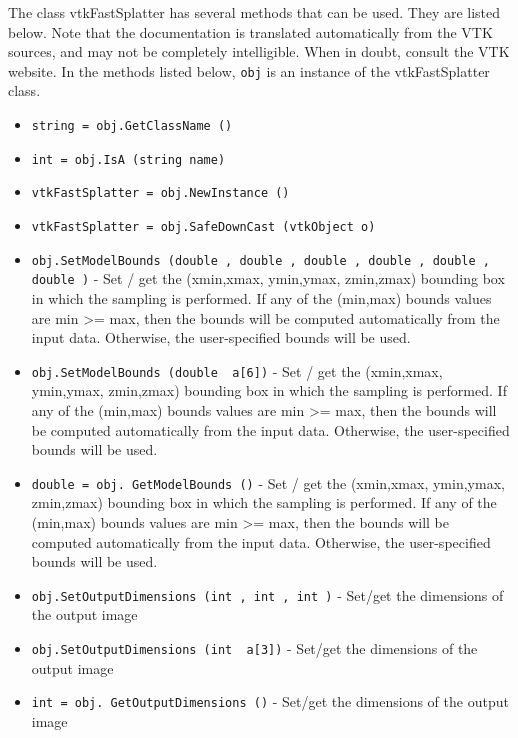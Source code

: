 The class vtkFastSplatter has several methods that can be used.
  They are listed below.
Note that the documentation is translated automatically from the VTK sources,
and may not be completely intelligible.  When in doubt, consult the VTK website.
In the methods listed below, \verb|obj| is an instance of the vtkFastSplatter class.
\begin{itemize}
\item  \verb|string = obj.GetClassName ()|

\item  \verb|int = obj.IsA (string name)|

\item  \verb|vtkFastSplatter = obj.NewInstance ()|

\item  \verb|vtkFastSplatter = obj.SafeDownCast (vtkObject o)|

\item  \verb|obj.SetModelBounds (double , double , double , double , double , double )| -  Set / get the (xmin,xmax, ymin,ymax, zmin,zmax) bounding box in which
 the sampling is performed. If any of the (min,max) bounds values are
 min >= max, then the bounds will be computed automatically from the input
 data. Otherwise, the user-specified bounds will be used.

\item  \verb|obj.SetModelBounds (double  a[6])| -  Set / get the (xmin,xmax, ymin,ymax, zmin,zmax) bounding box in which
 the sampling is performed. If any of the (min,max) bounds values are
 min >= max, then the bounds will be computed automatically from the input
 data. Otherwise, the user-specified bounds will be used.

\item  \verb|double = obj. GetModelBounds ()| -  Set / get the (xmin,xmax, ymin,ymax, zmin,zmax) bounding box in which
 the sampling is performed. If any of the (min,max) bounds values are
 min >= max, then the bounds will be computed automatically from the input
 data. Otherwise, the user-specified bounds will be used.

\item  \verb|obj.SetOutputDimensions (int , int , int )| -  Set/get the dimensions of the output image

\item  \verb|obj.SetOutputDimensions (int  a[3])| -  Set/get the dimensions of the output image

\item  \verb|int = obj. GetOutputDimensions ()| -  Set/get the dimensions of the output image


\end{itemize}
